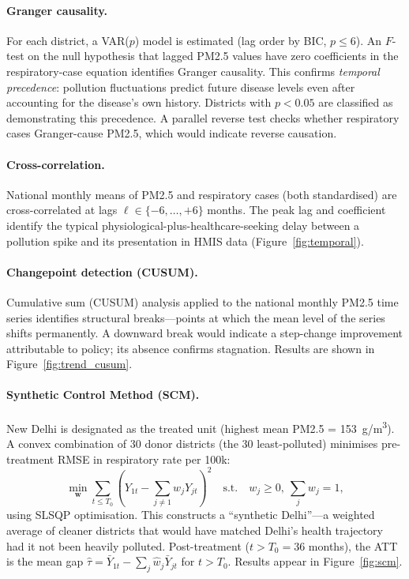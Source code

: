 \documentclass{article}
\begin{document}
\paragraph{Granger causality.}
For each district, a VAR($p$) model is estimated (lag order by BIC, $p \leq 6$). An
$F$-test on the null hypothesis that lagged PM2.5 values have zero coefficients in the
respiratory-case equation identifies Granger causality. This confirms \emph{temporal
precedence}: pollution fluctuations predict future disease levels even after accounting
for the disease's own history. Districts with $p < 0.05$ are classified as demonstrating
this precedence. A parallel reverse test checks whether respiratory cases Granger-cause
PM2.5, which would indicate reverse causation.

\paragraph{Cross-correlation.}
National monthly means of PM2.5 and respiratory cases (both standardised) are
cross-correlated at lags $\ell \in \{-6, \ldots, +6\}$ months. The peak lag and
coefficient identify the typical physiological-plus-healthcare-seeking delay between
a pollution spike and its presentation in HMIS data (Figure~\ref{fig:temporal}).

\paragraph{Changepoint detection (CUSUM).}
Cumulative sum (CUSUM) analysis applied to the national monthly PM2.5 time series
identifies structural breaks---points at which the mean level of the series shifts
permanently. A downward break would indicate a step-change improvement attributable to
policy; its absence confirms stagnation. Results are shown in Figure~\ref{fig:trend_cusum}.

\paragraph{Synthetic Control Method (SCM).}
New Delhi is designated as the treated unit (highest mean PM2.5 = 153~\textmu{}g/m\textsuperscript{3}).
A convex combination of 30 donor districts (the 30 least-polluted) minimises
pre-treatment RMSE in respiratory rate per 100k:
\[
  \min_{\mathbf{w}} \sum_{t \leq T_0} \left(Y_{1t} - \sum_{j \neq 1} w_j Y_{jt}\right)^2
  \quad \text{s.t.} \quad w_j \geq 0,\ \sum_j w_j = 1,
\]
using SLSQP optimisation. This constructs a ``synthetic Delhi''---a weighted average of
cleaner districts that would have matched Delhi's health trajectory had it not been
heavily polluted. Post-treatment ($t > T_0 = 36$ months), the ATT is the mean gap
$\hat{\tau} = \bar{Y}_{1t} - \sum_j \hat{w}_j \bar{Y}_{jt}$ for $t > T_0$.
Results appear in Figure~\ref{fig:scm}.
\end{document}

